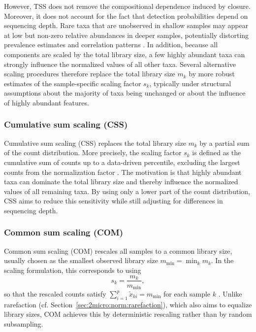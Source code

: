 However, TSS does not remove the compositional dependence induced by closure. Moreover, it does not account for the fact that detection probabilities depend on sequencing depth. Rare taxa that are unobserved in shallow samples may appear at low but non-zero relative abundances in deeper samples, potentially distorting prevalence estimates and correlation patterns \citep{weiss2017normalization}. In addition, because all components are scaled by the total library size, a few highly abundant taxa can strongly influence the normalized values of all other taxa. Several alternative scaling procedures therefore replace the total library size $m_k$ by more robust estimates of the sample-specific scaling factor $s_k$, typically under structural assumptions about the majority of taxa being unchanged or about the influence of highly abundant features.

\subsubsection*{Cumulative sum scaling (CSS)}

Cumulative sum scaling (CSS) replaces the total library size $m_k$ by a partial sum of the count distribution. More precisely, the scaling factor $s_k$ is defined as the cumulative sum of counts up to a data-driven percentile, excluding the largest counts from the normalization factor \citep{paulson2013differential,badri2020shrinkage}. The motivation is that highly abundant taxa can dominate the total library size and thereby influence the normalized values of all remaining taxa. By using only a lower part of the count distribution, CSS aims to reduce this sensitivity while still adjusting for differences in sequencing depth.

\subsubsection*{Common sum scaling (COM)}

Common sum scaling (COM) rescales all samples to a common library size, usually chosen as the smallest observed library size $m_{\min}=\min_k m_k$. In the scaling formulation, this corresponds to using
\begin{equation}
s_k = \frac{m_k}{m_{\min}},
\end{equation}
so that the rescaled counts satisfy $\sum_{i=1}^p \tilde{x}_{ki}=m_{\min}$ for each sample $k$ \citep{badri2020shrinkage}. Unlike rarefaction (cf. Section~\ref{sec:2micro:norm:rarefaction}), which also aims to equalize library sizes, COM achieves this by deterministic rescaling rather than by random subsampling.

